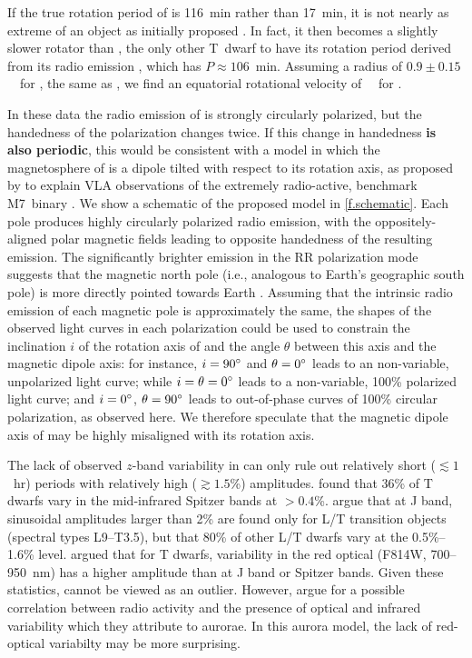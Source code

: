 \documentclass[twocolumn, times]{aastex6}
\begin{document}
If the true rotation period of  is 116~min rather than 17~min, it
is not nearly as extreme of an object as initially proposed \citep{rw16}. In
fact, it then becomes a slightly slower rotator than , the only
other T~dwarf to have its rotation period derived from its radio emission
\citep{wb15}, which has $P \approx 106$~min. Assuming a radius of $0.9 \pm
0.15$~\rjup\ for , the same as  \citep{vhl+04,
  wb15}, we find an equatorial rotational velocity of ~\kms\ for
.

In these data the radio emission of  is strongly circularly
polarized, but the handedness of the polarization changes twice. If this
change in handedness \textbf{is also periodic}, this would be
consistent with a model in which the magnetosphere of  is a
dipole tilted with respect to its rotation axis, as proposed by \citet{mbi+11}
to explain VLA observations of the extremely radio-active, benchmark M7~binary
 \citep[= 2MASS~J13142039$+$1320011; see also][]{sbh+14, wbi+15,
  fdr+16, dfr+16}. We show a schematic of the proposed model in
\autoref{f.schematic}. Each pole produces highly circularly polarized radio
emission, with the oppositely-aligned polar magnetic fields leading to
opposite handedness of the resulting emission. The significantly brighter
emission in the RR polarization mode suggests that the magnetic north pole
(i.e., analogous to Earth's geographic south pole) is more directly pointed
towards Earth \citep{kar+78, kar+78.erratum}. Assuming that the intrinsic
radio emission of each magnetic pole is approximately the same, the shapes of
the observed light curves in each polarization could be used to constrain the
inclination $i$ of the rotation axis of  and the angle $\theta$
between this axis and the magnetic dipole axis: for instance, $i = 90\mbox{$^\circ$}$
and $\theta = 0\mbox{$^\circ$}$ leads to an non-variable, unpolarized light curve; while
$i = \theta = 0\mbox{$^\circ$}$ leads to a non-variable, 100\% polarized light curve;
and $i = 0\mbox{$^\circ$}$, $\theta = 90\mbox{$^\circ$}$ leads to out-of-phase curves of 100\%
circular polarization, as observed here. We therefore speculate that the
magnetic dipole axis of  may be highly misaligned with its
rotation axis.

The lack of observed $z$-band variability in  can only rule out
relatively short (${\lesssim}1$~hr) periods with relatively high
(${\gtrsim}1.5$\%) amplitudes. \citet{mha+15} found that 36\% of T dwarfs vary
in the mid-infrared Spitzer bands at ${>}0.4$\%. \citet{rlja14} argue that at
J band, sinusoidal amplitudes larger than 2\% are found only for L/T
transition objects (spectral types L9--T3.5), but that 80\% of other L/T
dwarfs vary at the 0.5\%--1.6\% level. \citet{hmk15} argued that for T dwarfs,
variability in the red optical (F814W, 700--950~nm) has a higher amplitude
than at J band or Spitzer bands. Given these statistics,  cannot
be viewed as an outlier. However, \citet{khp+16} argue for a possible
correlation between radio activity and the presence of optical and infrared
variability which they attribute to aurorae. In this aurora model, the lack of
red-optical variabilty may be more surprising.
\end{document}
